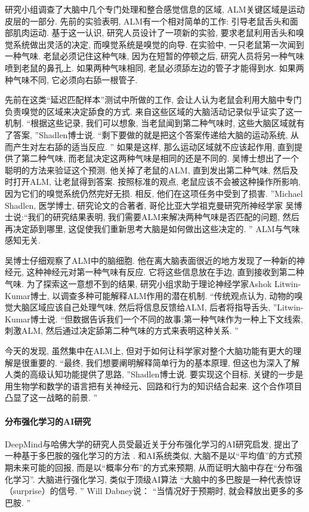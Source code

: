 \begin{itemize}
\begin{newexam}
研究小组调查了大脑中几个专门处理和整合感觉信息的区域, ALM关键区域是运动皮层的一部分.
先前的实验表明, ALM有一个相对简单的工作: 引导老鼠舌头和面部肌肉运动.
基于这一认识, 研究人员设计了一项新的实验, 要求老鼠利用舌头和嗅觉系统做出灵活的决定, 而嗅觉系统是嗅觉的向导. 在实验中, 一只老鼠第一次闻到一种气味.
老鼠必须记住这种气味, 因为在短暂的停顿之后, 研究人员将另一种气味喷到老鼠的鼻孔上. 如果两种气味相同, 老鼠必须舔左边的管子才能得到水. 如果两种气味不同, 它必须向右舔一根管子.
\end{newexam}

先前在这类“延迟匹配样本”测试中所做的工作, 会让人认为老鼠会利用大脑中专门负责嗅觉的区域来决定舔食的方式. 来自这些区域的大脑活动记录似乎证实了这一机制.
“根据这些记录, 我们可以想象, 当老鼠闻到第二种气味时, 这些大脑区域就有了答案, ”Shadlen博士说. “剩下要做的就是把这个答案传递给大脑的运动系统, 从而产生对左右舔的适当反应. ”
如果是这样, 那么运动区域就不应该起作用, 直到提供了第二种气味, 而老鼠决定这两种气味是相同的还是不同的. 吴博士想出了一个聪明的方法来验证这个预测. 他关掉了老鼠的ALM, 直到发出第二种气味, 然后及时打开ALM, 让老鼠得到答案.
按照标准的观点, 老鼠应该不会被这种操作所影响, 因为它们的嗅觉系统仍然完好无损. 相反, 他们在这项任务中受到了损害. ”Michael Shadlen, 医学博士, 研究论文的合著者, 哥伦比亚大学祖克曼研究所神经学家
吴博士说:“我们的研究结果表明, 我们需要ALM来解决两种气味是否匹配的问题, 然后再决定舔到哪里, 这促使我们重新思考大脑是如何做出这些决定的. ”
ALM与气味感知无关.

\begin{newexam}
吴博士仔细观察了ALM中的脑细胞. 他在离大脑表面很近的地方发现了一种新的神经元, 这种神经元对第一种气味有反应. 它将这些信息放在手边, 直到接收到第二种气味.
为了探索这一意想不到的结果, 研究小组求助于理论神经学家Ashok Litwin-Kumar博士, 以调查多种可能解释ALM作用的潜在机制.
“传统观点认为, 动物的嗅觉大脑区域应该自己处理气味, 然后将信息反馈给ALM, 后者将指导舌头, ”Litwin-Kumar博士说. “但数据告诉我们一个不同的故事;第一种气味作为一种上下文线索, 刺激ALM, 然后通过决定舔第二种气味的方式来表明这种关系. ”
\end{newexam}

今天的发现, 虽然集中在ALM上, 但对于如何让科学家对整个大脑功能有更大的理解是很重要的.
“最终, 我们想要阐明解释简单行为的基本原理, 但这也为深入了解人类的高级认知功能提供了思路, ”Shadlen博士说. 要实现这个目标, 关键的一步是用生物学和数学的语言把有关神经元、回路和行为的知识结合起来. 这个合作项目凸显了这一战略的前景. ”

\paragraph{分布强化学习的AI研究}
DeepMind与哈佛大学的研究人员受最近关于分布强化学习的AI研究启发, 提出了一种基于多巴胺的强化学习的方法 \cite{DabneyKurth-Nelson2020-9599}.
和AI系统类似, 大脑不是以“平均值”的方式预期未来可能的回报, 而是以“概率分布”的方式来预期, 从而证明大脑中存在“分布强化学习”. 大脑进行强化学习, 类似于顶级AI算法
“大脑中的多巴胺是一种代表惊讶（surprise）的信号. ” Will Dabney说： “当情况好于预期时, 就会释放出更多的多巴胺. ”


\end{itemize}
